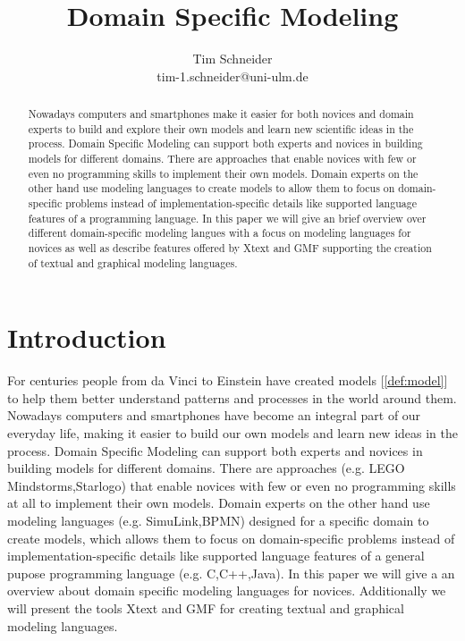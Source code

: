 \documentclass[runningheads,a4paper]{llncs}
\begin{document}
\mainmatter  %

\title{Domain Specific Modeling}



\author{Tim Schneider\\ tim-1.schneider@uni-ulm.de}


\maketitle


\begin{abstract}
Nowadays computers and smartphones make it easier for both novices and domain experts to build 
and explore their own models and learn new scientific ideas in the process.
Domain Specific Modeling can support both experts and novices in building models for different domains.
There are approaches that enable novices with few or even no programming skills to implement their own models.
Domain experts on the other hand use modeling languages to create models to 
allow them to focus on domain-specific problems instead of implementation-specific details like supported 
language features of a programming language. 
In this paper we will give an brief overview over different domain-specific modeling langues with a focus on modeling languages for novices
as well as describe features offered by Xtext and GMF supporting the creation of textual and graphical modeling languages.
\end{abstract}

\section{Introduction}
\label{sec:introduction}
For centuries people from da Vinci to Einstein have created models [\ref{def:model}] to help them better 
understand patterns and processes in the world around them. 
Nowadays computers and smartphones have become an integral part of our everyday life, making
it easier to build our own models and learn new ideas in the process.
Domain Specific Modeling can support both experts and novices in building models for different domains.
There are approaches (e.g. LEGO Mindstorms,Starlogo) that enable novices with few or even no programming 
skills at all to implement their own models. Domain experts on the other hand use modeling languages 
(e.g. SimuLink,BPMN) designed for a specific domain to create models, which allows them to focus on 
domain-specific problems instead of implementation-specific details like supported 
language features of a general pupose programming language (e.g. C,C++,Java).
In this paper we will give a an overview about domain specific modeling languages for novices.
Additionally we will present the tools Xtext and GMF for creating textual and graphical modeling languages. 
\end{document}
